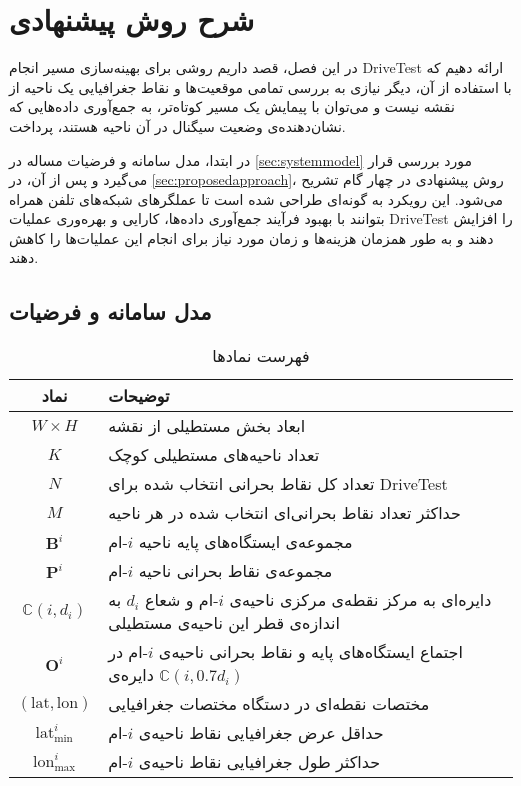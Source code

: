 \chapter{شرح روش پیشنهادی}
\label{chap:approach}

در این فصل، قصد داریم روشی برای بهینه‌سازی مسیر انجام 
\gls{DriveTest}
ارائه دهیم که با استفاده از آن، دیگر نیازی به بررسی تمامی موقعیت‌ها و نقاط جغرافیایی یک ناحیه از نقشه نیست و می‌توان با پیمایش یک مسیر کوتاه‌تر، به جمع‌آوری داده‌هایی که نشان‌دهنده‌ی وضعیت سیگنال در آن ناحیه هستند، پرداخت. 

در ابتدا، مدل سامانه و فرضیات مساله در 
\autoref{sec:systemmodel}
مورد بررسی قرار می‌گیرد و پس از آن، در 
\autoref{sec:proposedapproach}،
روش پیشنهادی در چهار گام تشریح می‌شود. این رویکرد به گونه‌ای طراحی شده است تا عملگرهای شبکه‌های تلفن همراه بتوانند با بهبود فرآیند جمع‌آوری داده‌ها، کارایی و بهره‌وری عملیات \gls{DriveTest} را افزایش دهند و به‌ طور همزمان هزینه‌ها و زمان مورد نیاز برای انجام این عملیات‌ها را کاهش دهند.

\section{مدل سامانه و فرضیات}
\label{sec:systemmodel}


\begin{table}
	\centering
	\renewcommand{\arraystretch}{2}
	\caption{فهرست نمادها}
	\begin{tabular}{cp{13cm}}
		\toprule
		\textbf{نماد} &  \textbf{توضیحات} \\
		\midrule
		$W\times H$ &
		ابعاد بخش مستطیلی از نقشه \\
		$K$ &
		تعداد ناحیه‌های مستطیلی کوچک \\
		$N$ &
		تعداد کل نقاط بحرانی‌ انتخاب شده برای \gls{DriveTest} \\
		$M$ &
		حداکثر تعداد نقاط بحرانی‌‌ای انتخاب شده در هر ناحیه \\
		$\mathbf{B}^i$ &
		مجموعه‌ی ایستگاه‌های پایه ناحیه $i$-ام \\
		$\mathbf{P}^i$ &
		مجموعه‌ی نقاط بحرانی ناحیه $i$-ام \\
		$\mathbb{C}(i, d_i)$ &
		دایره‌ای به مرکز نقطه‌ی مرکزی ناحیه‌ی $i$-ام و شعاع $d_i$ به اندازه‌ی قطر این ناحیه‌ی مستطیلی \\
		$\mathbf{O}^i$ &
		اجتماع ایستگاه‌های پایه و نقاط بحرانی ناحیه‌ی $i$-ام در دایره‌ی $\mathbb{C}(i, 0.7d_i)$
		\\
		$(\text{lat},\text{lon})$ &
		مختصات نقطه‌ای در دستگاه مختصات جغرافیایی \\
		$\text{lat}_{\min}^i$ &
		حداقل عرض جغرافیایی نقاط ناحیه‌ی $i$-ام \\
		$\text{lon}_{\max}^i$ &
		حداکثر طول جغرافیایی نقاط ناحیه‌ی $i$-ام \\
		\bottomrule 
	\end{tabular}
	\label{tab:symbols}
\end{table}


